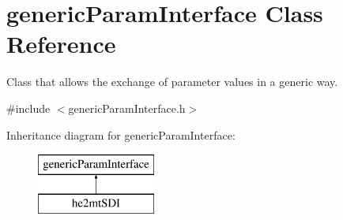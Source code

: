 \hypertarget{classgeneric_param_interface}{\section{generic\-Param\-Interface Class Reference}
\label{classgeneric_param_interface}
}


Class that allows the exchange of parameter values in a generic way.  




{\ttfamily \#include $<$generic\-Param\-Interface.\-h$>$}

Inheritance diagram for generic\-Param\-Interface\-:\begin{figure}[H]
\begin{center}
\leavevmode
\includegraphics[height=2.000000cm]{classgeneric_param_interface}
\end{center}
\end{figure}
